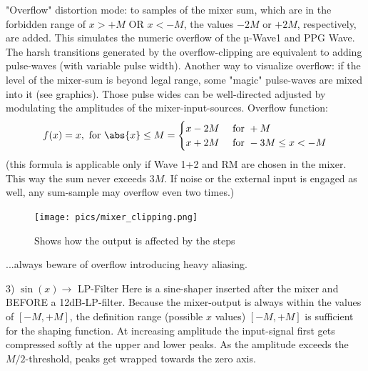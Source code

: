 "Overflow" distortion mode: to samples of the mixer sum, which are in the forbidden range of $x>+M$ OR $x<-M$, the values $-2M$ or $+2M$, respectively, are added. This simulates the numeric overflow of the µ-Wave1 and PPG Wave. The harsh transitions generated by the overflow-clipping are equivalent to adding pulse-waves (with variable pulse width).
Another way to visualize overflow:
if the level of the mixer-sum is beyond legal range, some "magic" pulse-waves are mixed into it (see graphics). Those pulse wides can be well-directed adjusted by modulating the amplitudes of the mixer-input-sources.
Overflow function:
\begin{align*}
	f(x) = {x, \for \abs{x} \leq M} = \begin{cases}
		x-2M  &\for +M\\
		x+2M  &\for -3M\leq x < -M
	\end{cases}
\end{align*}
	(this formula is applicable only if Wave 1+2 and RM are chosen in the mixer. This way the sum never exceeds $3M$. If noise or the external input is engaged as well, any sum-sample may overflow even two times.)
	\bigskip %
	\begin{figure}[ht!]
		\centering
		\texttt{[image: pics/mixer\_clipping.png]}
		\caption{Shows how the output is affected by the steps}
		\label{mixer_clipping}
	\end{figure}
	
	...always beware of overflow introducing heavy aliasing.
	
	3) $\sin(x)\to$ LP-Filter
	Here is a sine-shaper inserted after the mixer and BEFORE a 12dB-LP-filter. Because the mixer-output is always within the values of $[-M , +M]$, the definition range (possible $x$ values) $[-M, +M]$ is sufficient for the shaping function. At increasing amplitude the input-signal first gets compressed softly at the upper and lower peaks. As the amplitude exceeds the $M/2$-threshold, peaks get wrapped towards the zero axis.
	
